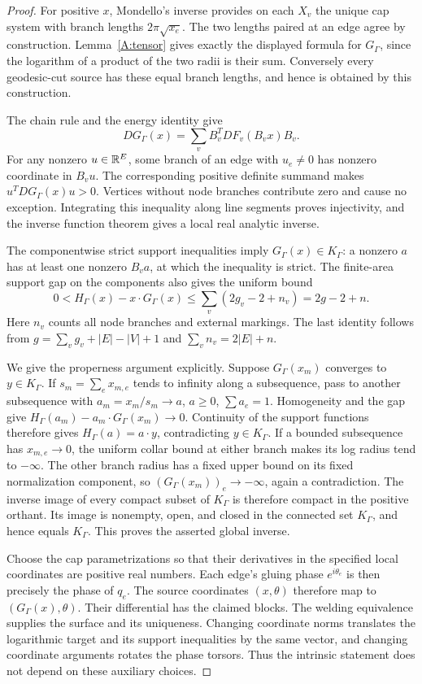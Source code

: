 \begin{proof}
For positive $x$, Mondello's inverse provides on each $X_v$ the unique
cap system with branch lengths $2\pi\sqrt{x_e}$. The two lengths paired
at an edge agree by construction. Lemma~\ref{A:tensor} gives exactly the
displayed formula for $G_\Gamma$, since the logarithm of a product of
the two radii is their sum. Conversely every geodesic-cut source has
these equal branch lengths, and hence is obtained by this construction.

The chain rule and the energy identity give
\[
 DG_\Gamma(x)=\sum_v B_v^T DF_v(B_vx)B_v.
\]
For any nonzero $u\in{\mathbb{R}}^E$, some branch of an edge with $u_e\ne0$
has nonzero coordinate in $B_vu$. The corresponding positive definite
summand makes $u^TDG_\Gamma(x)u>0$. Vertices without node branches
contribute zero and cause no exception. Integrating this inequality
along line segments proves injectivity, and the inverse function
theorem gives a local real analytic inverse.

The componentwise strict support inequalities imply
$G_\Gamma(x)\in K_\Gamma$: a nonzero $a$ has at least one nonzero
$B_va$, at which the inequality is strict. The finite-area support
gap on the components also gives the uniform bound
\[
 0<H_\Gamma(x)-x\cdot G_\Gamma(x)
       \leq\sum_v(2g_v-2+n_v)=2g-2+n.
\]
Here $n_v$ counts all node branches and external markings. The last
identity follows from $g=\sum_vg_v+|E|-|V|+1$ and
$\sum_v n_v=2|E|+n$.

We give the properness argument explicitly. Suppose $G_\Gamma(x_m)$
converges to $y\in K_\Gamma$. If $s_m=\sum_e x_{m,e}$ tends to
infinity along a subsequence, pass to another subsequence with
$a_m=x_m/s_m\to a$, $a\geq0$, $\sum a_e=1$. Homogeneity and the gap
give $H_\Gamma(a_m)-a_m\cdot G_\Gamma(x_m)\to0$.
Continuity of the support functions therefore gives
$H_\Gamma(a)=a\cdot y$, contradicting $y\in K_\Gamma$.
If a bounded subsequence has $x_{m,e}\to0$, the uniform collar bound
at either branch makes its log radius tend to $-\infty$. The other
branch radius has a fixed upper bound on its fixed normalization
component, so $(G_\Gamma(x_m))_e\to-\infty$, again a contradiction.
The inverse image of every compact subset of $K_\Gamma$ is therefore
compact in the positive orthant. Its image is nonempty, open, and
closed in the connected set $K_\Gamma$, and hence equals $K_\Gamma$.
This proves the asserted global inverse.

Choose the cap parametrizations so that their derivatives in the
specified local coordinates are positive real numbers. Each edge's
gluing phase $e^{i\theta_e}$ is then precisely the phase of $q_e$.
The source coordinates $(x,\theta)$ therefore map to
$(G_\Gamma(x),\theta)$. Their differential has the claimed blocks.
The welding equivalence supplies the surface and its uniqueness.
Changing coordinate norms translates the logarithmic target and its
support inequalities by the same vector, and changing coordinate
arguments rotates the phase torsors. Thus the intrinsic statement
does not depend on these auxiliary choices.
\end{proof}

